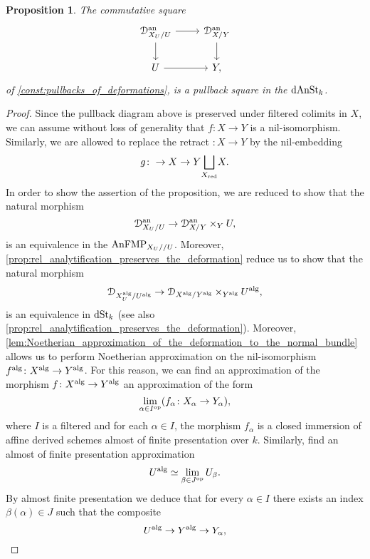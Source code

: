 \documentclass[10pt,a4paper,reqno]{amsart} %
\theoremstyle{plain}
\newtheorem{prop}[thm]{Proposition}
\theoremstyle{definition}
\theoremstyle{remark}
\numberwithin{equation}{section}
\begin{document}
\begin{prop} \label{prop:gluing_the_deformation}
    The commutative square
        \[
        \begin{tikzcd}
            \cD_{X_U/ U}\an \ar{r} \ar{d} & \cD_{X/ Y} \an \ar{d} \\
            U \ar{r} & Y, 
        \end{tikzcd}
        \]
    of \cref{const:pullbacks_of_deformations}, is a pullback square in the \infcat $\mathrm{dAnSt}_k$.
\end{prop}

\begin{proof} Since the pullback diagram above is preserved under filtered colimits in $X$, we can assume without loss of generality that
    $f \colon X\to Y$ is a nil-isomorphism. Similarly, we are allowed to replace the retract $ \colon X \to Y$ by the nil-embedding
        \[
            g \colon \to X \to Y \underset{X_{\mathrm{red}}}{\bigsqcup} X.  
        \]
    In order to show the assertion of the proposition, we are reduced to show that the natural morphism
        \[
            \mathcal D_{X_U/ U}^\mathrm{an} \to \mathcal D^\mathrm{an}_{X/ Y} \times_Y U,  
        \]
    is an equivalence in the \infcat $\mathrm{AnFMP}_{X_U/ /U}$. Moreover, \cref{prop:rel_analytification_preserves_the_deformation} reduce us
    to show that the natural morphism
        \[
            \mathcal D_{X_U^\mathrm{alg}/ U^\mathrm{alg}} \to \mathcal D_{X^\mathrm{alg}/ Y^\mathrm{alg}} \times_{Y^\mathrm{alg}}U^\mathrm{alg},
        \]
    is an equivalence in $\mathrm{dSt}_k$ (see also \cref{prop:rel_analytification_preserves_the_deformation}). 
    Moreover, \cref{lem:Noetherian_approximation_of_the_deformation_to_the_normal_bundle} allows us to perform Noetherian approximation on the
    nil-isomorphism $f ^\mathrm{alg} \colon X^\mathrm{alg} \to Y^\mathrm{alg}$.
    For this reason, we can find an approximation of the morphism $f \colon X ^\mathrm{alg} \to Y^\mathrm{alg}$
    an approximation of the form
        \[
            \lim_{\alpha \in I^\mathrm{op}} ( f_\alpha \colon X_\alpha \to Y_\alpha ),  
        \]
    where $I$ is a filtered \infcat and for each $\alpha \in I$, the morphism $f_\alpha$ is a closed immersion of affine derived schemes
    almost of finite presentation over $k$. Similarly, find an almost of finite presentation approximation
        \[
            U ^\mathrm{alg} \simeq \lim_{\beta \in J^\mathrm{op}} U_\beta.  
        \]
    By almost finite presentation we deduce that for every $\alpha \in I$ there exists an index $\beta(\alpha) \in J$ such that the composite
        \begin{equation} \label{eq:factorization}
             U^\mathrm{alg} \to Y^\mathrm{alg} \to Y_\alpha,
        \end{equation}

\end{proof}
\end{document}

